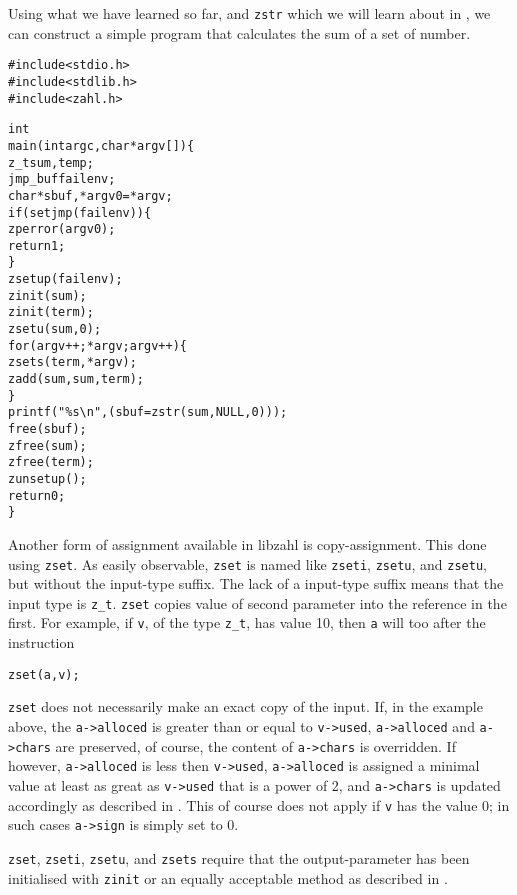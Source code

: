 Using what we have learned so far, and {\tt zstr}
which we will learn about in ,
we can construct a simple program that calculates the
sum of a set of number.

\begin{alltt}
   \textcolor{c}{#include <stdio.h>
   #include <stdlib.h>
   #include <zahl.h>}

   int
   main(int argc, char *argv[]) \{
       z_t sum, temp;
       \textcolor{c}{jmp_buf failenv;
       char *sbuf, *argv0 = *argv;
       if (setjmp(failenv)) \{
           zperror(argv0);
           return 1;
       \}
       zsetup(failenv);
       zinit(sum);
       zinit(term);}
       zsetu(sum, 0);
       for (argv++; *argv; argv++) \{
           zsets(term, *argv);
           zadd(sum, sum, term);
       \}
       \textcolor{c}{printf("\%s\textbackslash{}n", (sbuf = zstr(sum, NULL, 0)));
       free(sbuf);
       zfree(sum);
       zfree(term);
       zunsetup();
       return 0;}
   \}
\end{alltt}

Another form of assignment available in libzahl is
copy-assignment. This done using {\tt zset}. As
easily observable, {\tt zset} is named like
{\tt zseti}, {\tt zsetu}, and {\tt zsetu}, but
without the input-type suffix. The lack of a
input-type suffix means that the input type is
{\tt z\_t}. {\tt zset} copies value of second
parameter into the reference in the first. For
example, if {\tt v}, of the type {\tt z\_t}, has
value 10, then {\tt a} will too after the instruction

\begin{alltt}
   zset(a, v);
\end{alltt}

{\tt zset} does not necessarily make an exact
copy of the input. If, in the example above, the
{\tt a->alloced} is greater than or equal to
{\tt v->used}, {\tt a->alloced} and {\tt a->chars}
are preserved, of course, the content of
{\tt a->chars} is overridden. If however,
{\tt a->alloced} is less then {\tt v->used},
{\tt a->alloced} is assigned a minimal value at
least as great as {\tt v->used} that is a power
of 2, and {\tt a->chars} is updated accordingly
as described in .
This of course does not apply if {\tt v} has the
value 0; in such cases {\tt a->sign} is simply
set to 0.

{\tt zset}, {\tt zseti}, {\tt zsetu}, and
{\tt zsets} require that the output-parameter
has been initialised with {\tt zinit} or an
equally acceptable method as described in
.

